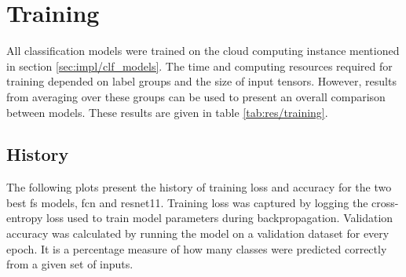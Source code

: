 \section{Training} \label{sec:res/training}

All classification models were trained on the cloud computing instance mentioned in section \ref{sec:impl/clf_models}. The time and computing resources required for training depended on label groups and the size of input tensors. However, results from averaging over these groups can be used to present an overall comparison between models. These results are given in table \ref{tab:res/training}.

\begin{table}[h!]
    \caption{Average time and epochs elapsed during training for all model architectures.}
    \label{tab:res/training}
\end{table}
\FloatBarrier

\subsection{History}

The following plots present the history of training loss and accuracy for the two best \acrshort{fs} models, \acrshort{fcn} and \acrshort{resnet11}. Training loss was captured by logging the cross-entropy loss used to train model parameters during backpropagation. Validation accuracy was calculated by running the model on a validation dataset for every epoch. It is a percentage measure of how many classes were predicted correctly from a given set of inputs.


